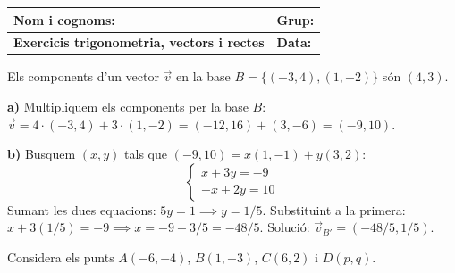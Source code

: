 \documentclass[12pt,a4paper,answers]{exam} %
\begin{document}
\begingroup
\renewcommand{\arraystretch}{2.2}
\begin{tabularx}{\textwidth}{|X|p{4cm}|}
    \hline
    \textbf{Nom i cognoms:} & \textbf{Grup:} \\ \hline
    \textbf{Exercicis trigonometria, vectors i rectes} & \textbf{Data:} \\ \hline
\end{tabularx}
\endgroup

\vspace{0.5cm}

\begin{questions}

    \question Els components d'un vector $\vec{v}$ en la base $B=\{(-3,4),(1,-2)\}$ són $(4,3)$.

    \begin{solution}
        \textbf{a)} Multipliquem els components per la base $B$: 
        $\vec{v} = 4 \cdot (-3, 4) + 3 \cdot (1, -2) = (-12, 16) + (3, -6) = (-9, 10)$.
        
        \textbf{b)} Busquem $(x, y)$ tals que $(-9, 10) = x(1, -1) + y(3, 2)$:
        \[ \begin{cases} x + 3y = -9 \\ -x + 2y = 10 \end{cases} \]
        Sumant les dues equacions: $5y = 1 \implies y = 1/5$.
        Substituint a la primera: $x + 3(1/5) = -9 \implies x = -9 - 3/5 = -48/5$.
        Solució: $\vec{v}_{B'} = (-48/5, 1/5)$.
    \end{solution}

    \question Considera els punts $A(-6,-4)$, $B(1,-3)$, $C(6,2)$ i $D(p,q)$.
\end{questions}
\end{document}
